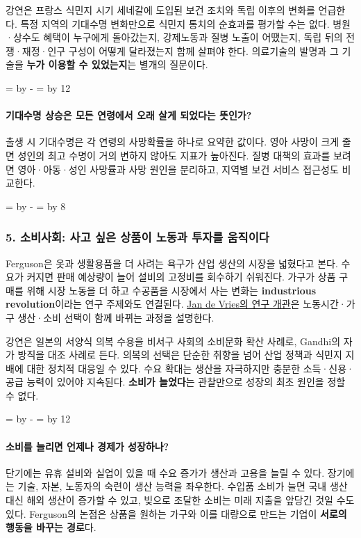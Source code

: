 \documentclass[10pt,a4paper]{article}
\newcommand{\ReserveQuestionSpace}{%
  \par\begingroup
  \dimen0=\pagegoal \advance\dimen0 by -\pagetotal
  \dimen2=\baselineskip \multiply\dimen2 by 12
  \ifdim\dimen0<\dimen2 \newpage\fi
  \endgroup}
\newcommand{\ReserveReadingSectionSpace}{%
  \par\begingroup
  \dimen0=\pagegoal \advance\dimen0 by -\pagetotal
  \dimen2=\baselineskip \multiply\dimen2 by 8
  \ifdim\dimen0<\dimen2 \newpage\fi
  \endgroup}
\begin{document}
강연은 프랑스 식민지 시기 세네갈에 도입된 보건 조치와 독립 이후의 변화를 언급한다. 특정 지역의 기대수명 변화만으로 식민지 통치의 순효과를 평가할 수는 없다. 병원·상수도 혜택이 누구에게 돌아갔는지, 강제노동과 질병 노출이 어땠는지, 독립 뒤의 전쟁·재정·인구 구성이 어떻게 달라졌는지 함께 살펴야 한다. 의료기술의 발명과 그 기술을 \textbf{누가 이용할 수 있었는지}는 별개의 질문이다.\par

\ReserveQuestionSpace
\paragraph{기대수명 상승은 모든 연령에서 오래 살게 되었다는 뜻인가?}
출생 시 기대수명은 각 연령의 사망확률을 하나로 요약한 값이다. 영아 사망이 크게 줄면 성인의 최고 수명이 거의 변하지 않아도 지표가 높아진다. 질병 대책의 효과를 보려면 영아·아동·성인 사망률과 사망 원인을 분리하고, 지역별 보건 서비스 접근성도 비교한다.\par

\ReserveReadingSectionSpace
\subsubsection*{5. 소비사회: 사고 싶은 상품이 노동과 투자를 움직이다}

Ferguson은 옷과 생활용품을 더 사려는 욕구가 산업 생산의 시장을 넓혔다고 본다. 수요가 커지면 판매 예상량이 늘어 설비의 고정비를 회수하기 쉬워진다. 가구가 상품 구매를 위해 시장 노동을 더 하고 수공품을 시장에서 사는 변화는 \textbf{industrious revolution}이라는 연구 주제와도 연결된다. \href{https://assets.cambridge.org/97805218/95026/excerpt/9780521895026\_excerpt.htm}{Jan de Vries의 연구 개관}은 노동시간·가구 생산·소비 선택이 함께 바뀌는 과정을 설명한다.\par

강연은 일본의 서양식 의복 수용을 비서구 사회의 소비문화 확산 사례로, Gandhi의 자가 방직을 대조 사례로 든다. 의복의 선택은 단순한 취향을 넘어 산업 정책과 식민지 지배에 대한 정치적 대응일 수 있다. 수요 확대는 생산을 자극하지만 충분한 소득·신용·공급 능력이 있어야 지속된다. \textbf{소비가 늘었다}는 관찰만으로 성장의 최초 원인을 정할 수 없다.\par

\ReserveQuestionSpace
\paragraph{소비를 늘리면 언제나 경제가 성장하나?}
단기에는 유휴 설비와 실업이 있을 때 수요 증가가 생산과 고용을 늘릴 수 있다. 장기에는 기술, 자본, 노동자의 숙련이 생산 능력을 좌우한다. 수입품 소비가 늘면 국내 생산 대신 해외 생산이 증가할 수 있고, 빚으로 조달한 소비는 미래 지출을 앞당긴 것일 수도 있다. Ferguson의 논점은 상품을 원하는 가구와 이를 대량으로 만드는 기업이 \textbf{서로의 행동을 바꾸는 경로}다.\par
\end{document}
